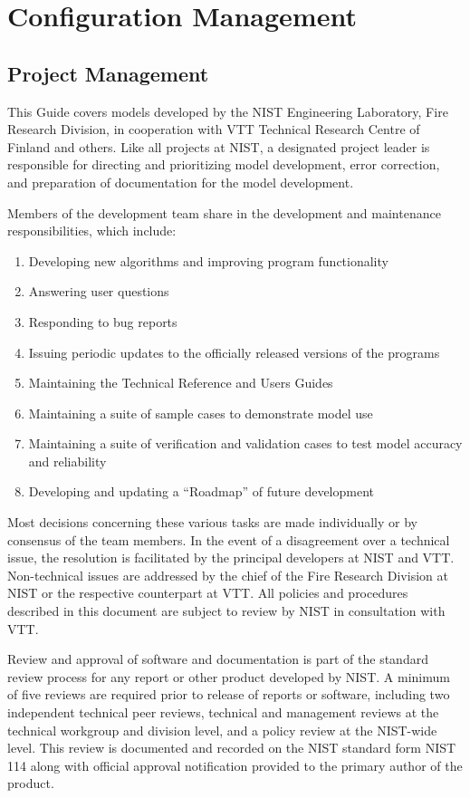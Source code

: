\documentclass[11pt]{book}
\begin{document}
\chapter{Configuration Management}

\section{Project Management}

This Guide covers models developed by the NIST Engineering Laboratory, Fire Research Division, in cooperation with VTT Technical Research Centre of Finland and others. Like all projects at NIST, a designated project leader is responsible for directing and prioritizing model development, error correction, and preparation of documentation for the model development.

Members of the development team share in the development and maintenance responsibilities, which include:
\begin{enumerate}
\item Developing new algorithms and improving program functionality
\item Answering user questions
\item Responding to bug reports
\item Issuing periodic updates to the officially released versions of the programs
\item Maintaining the Technical Reference and Users Guides
\item Maintaining a suite of sample cases to demonstrate model use
\item Maintaining a suite of verification and validation cases to test model accuracy and reliability
\item Developing and updating a ``Roadmap'' of future development
\end{enumerate}
Most decisions concerning these various tasks are made individually or by consensus of the team members. In the event of a disagreement over a technical issue, the resolution is facilitated by the principal developers at NIST and VTT. Non-technical issues are addressed by the chief of the Fire Research Division at NIST or the respective counterpart at VTT. All policies and procedures described in this document are subject to review by NIST in consultation with VTT.

Review and approval of software and documentation is part of the standard review process for any report or other product developed by NIST. A minimum of five reviews are required prior to release of reports or software, including two independent technical peer reviews, technical and management reviews at the technical workgroup and division level, and a policy review at the NIST-wide level.  This review is documented and recorded on the NIST standard form NIST 114 along with official approval notification provided to the primary author of the product.
\end{document}
